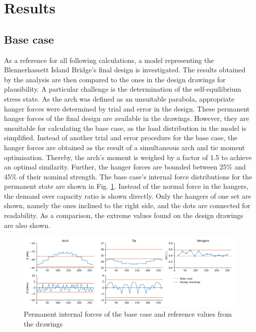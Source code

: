 \section{Results}\label{sec:results}

\subsection{Base case}
As a reference for all following calculations, a model representing the Blennerhassett Island Bridge's final design is investigated. The results obtained by the analysis are then compared to the ones in the design drawings for plausibility. A particular challenge is the determination of the self-equilibrium stress state. As the arch was defined as an unsuitable parabola, appropriate hanger forces were determined by trial and error in the design. These permanent hanger forces of the final design are available in the drawings. However, they are unsuitable for calculating the base case, as the load distribution in the model is simplified. Instead of another trial and error procedure for the base case, the hanger forces are obtained as the result of a simultaneous arch and tie moment optimisation. Thereby, the arch's moment is weighed by a factor of 1.5 to achieve an optimal similarity. Further, the hanger forces are bounded between 25\% and 45\% of their nominal strength. The base case's internal force distributions for the permanent state are shown in Fig. \ref{fig:base_case_permanent}. Instead of the normal force in the hangers, the demand over capacity ratio is shown directly. Only the hangers of one set are shown, namely the ones inclined to the right side, and the dots are connected for readability. As a comparison, the extreme values found on the design drawings are also shown.

\begin{figure}[H]
    \centering
    \includegraphics[width=\textwidth]{calculations/Base case/Permanent state.png}
    \caption{Permanent internal forces of the base case and reference values from the drawings}
    \label{fig:base_case_permanent}
\end{figure}

